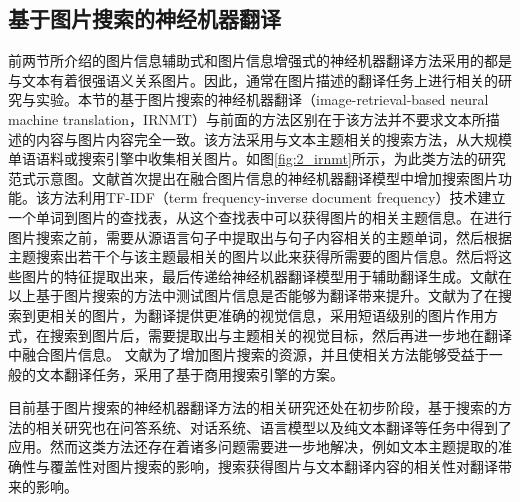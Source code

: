 \subsection{基于图片搜索的神经机器翻译}

前两节所介绍的图片信息辅助式和图片信息增强式的神经机器翻译方法采用的都是与文本有着很强语义关系图片。因此，通常在图片描述的翻译任务上进行相关的研究与实验。本节的基于图片搜索的神经机器翻译（image-retrieval-based neural machine translation，IRNMT）与前面的方法区别在于该方法并不要求文本所描述的内容与图片内容完全一致。该方法采用与文本主题相关的搜索方法，从大规模单语语料或搜索引擎中收集相关图片。如图\ref{fig:2_irnmt}所示，为此类方法的研究范式示意图。文献\cite{118_DBLP:conf/iclr/0001C0USLZ20}首次提出在融合图片信息的神经机器翻译模型中增加搜索图片功能。该方法利用TF-IDF（term frequency-inverse document frequency）技术建立一个单词到图片的查找表，从这个查找表中可以获得图片的相关主题信息。在进行图片搜索之前，需要从源语言句子中提取出与句子内容相关的主题单词，然后根据主题搜索出若干个与该主题最相关的图片以此来获得所需要的图片信息。然后将这些图片的特征提取出来，最后传递给神经机器翻译模型用于辅助翻译生成。文献\cite{20_wu-etal-2021-good}在以上基于图片搜索的方法中测试图片信息是否能够为翻译带来提升。文献\cite{119_fang-feng-2022-neural}为了在搜索到更相关的图片，为翻译提供更准确的视觉信息，采用短语级别的图片作用方式，在搜索到图片后，需要提取出与主题相关的视觉目标，然后再进一步地在翻译中融合图片信息。
文献\cite{120_tang-etal-2022-multimodal}为了增加图片搜索的资源，并且使相关方法能够受益于一般的文本翻译任务，采用了基于商用搜索引擎的方案。

目前基于图片搜索的神经机器翻译方法的相关研究还处在初步阶段，基于搜索的方法的相关研究也在问答系统\cite{121_DBLP:conf/icml/GuuLTPC20}、对话系统\cite{122_DBLP:conf/emnlp/WestonDM18}、语言模型\cite{123_DBLP:conf/iclr/KhandelwalLJZL20}以及纯文本翻译\cite{124_DBLP:conf/aaai/GuWCL18}等任务中得到了应用。然而这类方法还存在着诸多问题需要进一步地解决，例如文本主题提取的准确性与覆盖性对图片搜索的影响，搜索获得图片与文本翻译内容的相关性对翻译带来的影响。
